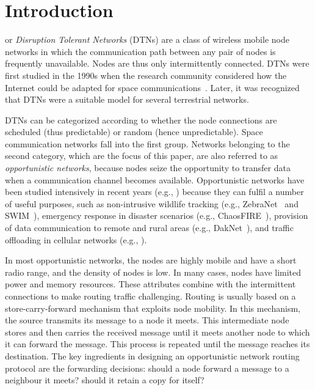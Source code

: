 \documentclass[journal,onecolumn,11pt]{IEEEtran}
\theoremstyle{plain}
\theoremstyle{definition}
\begin{document}
\section{Introduction}\label{sec:intro}
 or \textit{Disruption Tolerant Networks}
(DTNs) are a class of wireless mobile node networks in which the
communication path between any pair of nodes is frequently
unavailable. Nodes are thus only intermittently connected. DTNs were
first studied in the 1990s when the research community considered how
the Internet could be adapted for space
communications~\cite{voyiatzis2012survey}. Later, it was recognized
that DTNs were a suitable model for several terrestrial networks.

DTNs can be categorized according to whether the
node connections are scheduled (thus predictable) or random (hence
unpredictable). Space communication networks fall into the first
group. Networks belonging to the second category, which are the focus
of this paper, are also referred to as {\em opportunistic networks},
because nodes seize the opportunity to transfer data when a
communication channel becomes available. Opportunistic networks have been studied intensively in
recent years (e.g.,
\cite{khabbaz2012disruption,cao2013routing,wei2014survey}) because
they can fulfil a number of useful purposes, such as non-intrusive
wildlife tracking (e.g., ZebraNet~\cite{juang2002energy} and
SWIM~\cite{small2003shared}), emergency response in disaster scenarios
(e.g., ChaosFIRE~\cite{pataki2014sensor}), provision of data
communication to remote and rural areas (e.g.,
DakNet~\cite{pentland2004daknet}), and traffic offloading in cellular
networks (e.g., \cite{han2012mobile}).

In most opportunistic networks, the nodes are highly mobile and have a
short radio range, and the density of nodes is low. In many cases,
nodes have limited power and memory resources. These attributes
combine with the intermittent connections to make routing
traffic challenging. Routing is usually based on a store-carry-forward mechanism that
exploits node mobility. In this mechanism, the source transmits its
message to a node it meets. This intermediate node stores and then
carries the received message until it meets another node to which it
can forward the message. This process is repeated until the message
reaches its destination. The key ingredients in designing an
opportunistic network routing protocol are the forwarding decisions:
should a node forward a message to a neighbour it meets?  should it
retain a copy for itself?
\end{document}
